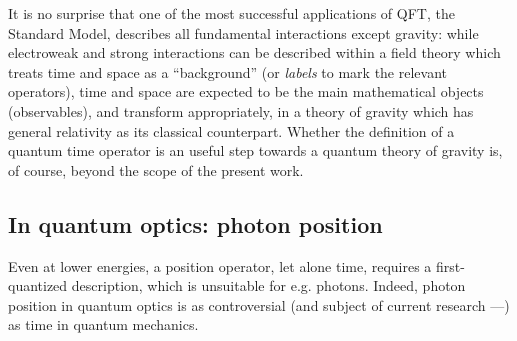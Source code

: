 It is no surprise that one of the most successful applications
of QFT, the Standard Model, describes all fundamental interactions except gravity:
while electroweak and strong interactions can be described within a field theory
which treats time and space as a ``background'' (or \emph{labels} to mark the relevant operators),
time and space are expected to be the main mathematical objects (observables),
and transform appropriately,
in a theory of gravity
which has general relativity as its classical counterpart.
Whether the definition of a quantum time operator is an useful step towards
a quantum theory of gravity is, of course, beyond the scope of the present work.

\subsection{In quantum optics: photon position}

Even at lower energies,
a position operator, let alone time, requires a first-quantized description,
which is unsuitable for e.g. photons.
Indeed, photon position in quantum optics is as controversial
(and subject of current research ---\cite{HawtonPhotonPosition, Hawton2019})
as time in quantum mechanics.


